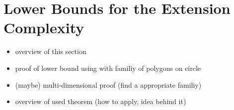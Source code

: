 \section{Lower Bounds for the Extension Complexity}

\begin{itemize}
  \item overview of this section
  \item proof of lower bound using \cite{averkov2016maximum} with familiy of polygons on circle
  \item (maybe) multi-dimensional proof (find a appropriate familiy)
  \item overview of used theorem (how to apply, idea behind it)
\end{itemize}

